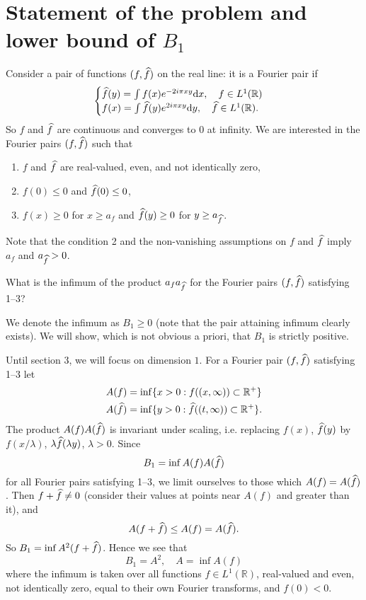 \section{Statement of the problem and lower bound of $B_{1}$}

Consider a pair of functions $(f, \widehat{f})$ on the real line: it is a Fourier pair if
\[
    \begin{cases}
    \widehat{f}(y) = \int f(x) e^{-2 i \pi x y} \mathrm{d} x, \quad f \in L^{1}(\mathbb{R}) \\
    f(x) = \int \widehat{f}(y) e^{2 i \pi x y} \mathrm{d} y, \quad \widehat{f} \in L^{1}(\mathbb{R}).
    \end{cases}
\]
So $f$ and $\widehat{f}$ are continuous and converges to $0$ at infinity.
We are interested in the Fourier pairs $(f, \widehat{f})$ such that
\begin{enumerate}
    \item $f$ and $\widehat{f}$ are real-valued, even, and not identically zero,
    \item $f(0) \leq 0$ and $\widehat{f}(0) \leq 0$,
    \item $f(x) \geq 0$ for $x \geq a_f$ and $\widehat{f}(y) \geq 0$ for $y \geq a_{\widehat{f}}$.
\end{enumerate}
Note that the condition 2 and the non-vanishing assumptions on $f$ and $\widehat{f}$ imply $a_f$ and $a_{\widehat{f}} > 0$.

\begin{problem*}
What is the infimum of the product $a_{f} a_{\widehat{f}}$ for the Fourier pairs $(f, \widehat{f})$ satisfying 1--3?
\end{problem*}

We denote the infimum as $B_1 \geq 0$ (note that the pair attaining infimum clearly exists).
We will show, which is not obvious a priori, that $B_1$ is strictly positive.

Until section 3, we will focus on dimension $1$.
For a Fourier pair $(f, \widehat{f})$ satisfying 1--3 let
\begin{align*}
    A(f) &= \inf\{x > 0: f((x, \infty)) \subset \mathbb{R}^{+}\} \\
    A(\widehat{f}) &= \inf\{y > 0: \widehat{f}((t, \infty)) \subset \mathbb{R}^{+}\} .
\end{align*}
The product $A(f)A(\widehat{f})$ is invariant under scaling, i.e. replacing $f(x)$, $\widehat{f}(y)$ by $f(x /\lambda)$, $\lambda \widehat{f}(\lambda y)$, $\lambda > 0$.
Since
\[
    B_1 = \inf A(f) A(\widehat{f})
\]
for all Fourier pairs satisfying 1--3, we limit ourselves to those which $A(f) = A(\widehat{f})$.
Then $f + \widehat{f} \neq 0$ (consider their values at points near $A(f)$ and greater than it), and
\[
    A(f + \widehat{f}) \leq A(f) = A(\widehat{f}).
\]
So $B_1 = \inf A^{2}(f + \widehat{f})$. Hence we see that
\[
    B_1 = A^2, \quad A = \inf A(f)
\]
where the infimum is taken over all functions $f \in L^{1}(\mathbb{R})$, real-valued and even, not identically zero, equal to their own Fourier transforms, and $f(0) < 0$.

